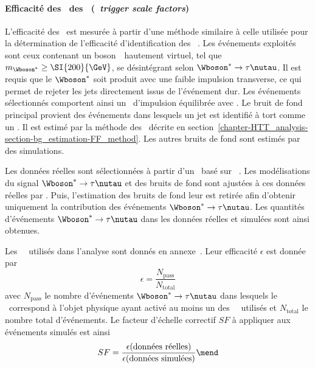 \paragraph{Efficacité des \HLTpaths\ des \tauh\ (\emph{\tauh\ trigger scale factors})}
L'efficacité des \HLTpaths\ est mesurée à partir d'une méthode
similaire à celle utilisée
pour la détermination de
l'efficacité d'identification des \tauh~\cite{CMS-NOTE-2019-163}.
Les événements exploités sont ceux contenant un boson~\Wboson\ hautement virtuel,
tel que $m_{\Wboson^*}\geq\SI{200}{\GeV}$,
se désintégrant selon $\Wboson^* \to \tau\nutau$.
Il est requis que le $\Wboson^*$ soit produit avec une faible impulsion transverse,
ce qui permet de rejeter les jets directement issus de l'événement dur.
Les événements sélectionnés comportent ainsi
un \tauh\ d'impulsion équilibrée avec \vMET.
Le bruit de fond principal provient des événements
dans lesquels un jet est identifié à tort comme un \tauh.
Il est estimé par la méthode des \fakefactors\ décrite en section~\ref{chapter-HTT_analysis-section-bg_estimation-FF_method}.
Les autres bruits de fond sont estimés par des simulations.
\par
Les données réelles sont sélectionnées à partir d'un \HLTpath\ basé sur \MET~\cite{CMS-NOTE-2019-163,CMS-NOTE-2020-218}.
Les modélisations du signal $\Wboson^* \to \tau\nutau$ et des bruits de fond sont ajustées à ces données réelles par \COMBINE.
Puis, l'estimation des bruits de fond leur est retirée afin d'obtenir uniquement la contribution des événements $\Wboson^* \to \tau\nutau$.
Les quantités d'événements $\Wboson^* \to \tau\nutau$ dans les données réelles et simulées sont ainsi obtenues.
\par
Les \HLTpaths\ \HLTSingleTau\ utilisés dans l'analyse sont donnés en annexe~.
Leur efficacité $\epsilon$ est donnée par
\begin{equation}
\epsilon = \frac{N_\text{pass}}{N_\text{total}}
\end{equation}
avec
$N_\text{pass}$ le nombre d'événements $\Wboson^* \to \tau\nutau$ dans lesquels le \tauh\ correspond à
l'objet physique ayant activé au moins un des \HLTpaths\ \HLTSingleTau\ utilisés
et
$N_\text{total}$ le nombre total d'événements.
Le facteur d'échelle correctif $SF$ à appliquer aux événements simulés est ainsi
\begin{equation}
SF = \frac{\epsilon(\text{données réelles})}{\epsilon(\text{données simulées})}
\mend
\end{equation}
